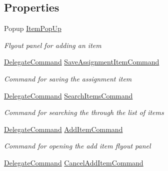 \subsection*{Properties}
\begin{DoxyCompactItemize}
\item 
Popup \hyperlink{class_field_service_1_1_win_r_t_1_1_view_models_1_1_item_view_model_a977e3475b1019da37ada16e88e3bd782}{Item\+Pop\+Up}
\begin{DoxyCompactList}\small\item\em Flyout panel for adding an item \end{DoxyCompactList}\item 
\hyperlink{class_delegate_command}{Delegate\+Command} \hyperlink{class_field_service_1_1_win_r_t_1_1_view_models_1_1_item_view_model_ac399ed01d675799ad752a3625ba1d081}{Save\+Assignment\+Item\+Command}
\begin{DoxyCompactList}\small\item\em Command for saving the assignment item \end{DoxyCompactList}\item 
\hyperlink{class_delegate_command}{Delegate\+Command} \hyperlink{class_field_service_1_1_win_r_t_1_1_view_models_1_1_item_view_model_a734e04598cac278dba23037f54b3606d}{Search\+Items\+Command}
\begin{DoxyCompactList}\small\item\em Command for searching the through the list of items \end{DoxyCompactList}\item 
\hyperlink{class_delegate_command}{Delegate\+Command} \hyperlink{class_field_service_1_1_win_r_t_1_1_view_models_1_1_item_view_model_a6f11bb8ed063036b5287741972a719f2}{Add\+Item\+Command}
\begin{DoxyCompactList}\small\item\em Command for opening the add item flyout panel \end{DoxyCompactList}\item 
\hyperlink{class_delegate_command}{Delegate\+Command} \hyperlink{class_field_service_1_1_win_r_t_1_1_view_models_1_1_item_view_model_a76b6c0e2da55bfa24c198bc0a07df265}{Cancel\+Add\+Item\+Command}

\end{DoxyCompactItemize}
